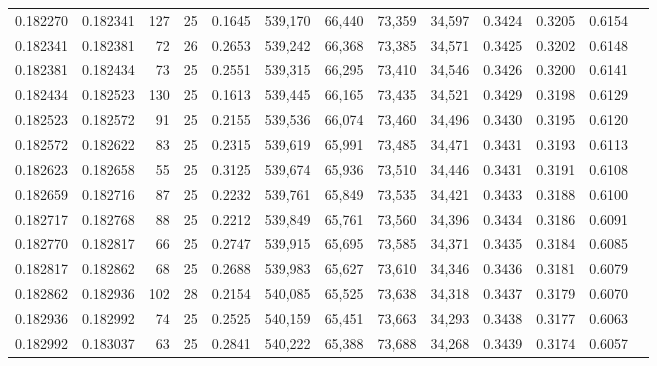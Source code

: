 \begin{tabular}{rrrrrrrrrrrrr}
0.182270 & 0.182341 &   127 &  25 &                                     0.1645 & 539,170 &  66,440 &  73,359 &  34,597 & 0.3424 & 0.3205 & 0.6154 \\
0.182341 & 0.182381 &    72 &  26 &                                     0.2653 & 539,242 &  66,368 &  73,385 &  34,571 & 0.3425 & 0.3202 & 0.6148 \\
0.182381 & 0.182434 &    73 &  25 &                                     0.2551 & 539,315 &  66,295 &  73,410 &  34,546 & 0.3426 & 0.3200 & 0.6141 \\
0.182434 & 0.182523 &   130 &  25 &                                     0.1613 & 539,445 &  66,165 &  73,435 &  34,521 & 0.3429 & 0.3198 & 0.6129 \\
0.182523 & 0.182572 &    91 &  25 &                                     0.2155 & 539,536 &  66,074 &  73,460 &  34,496 & 0.3430 & 0.3195 & 0.6120 \\
0.182572 & 0.182622 &    83 &  25 &                                     0.2315 & 539,619 &  65,991 &  73,485 &  34,471 & 0.3431 & 0.3193 & 0.6113 \\
0.182623 & 0.182658 &    55 &  25 &                                     0.3125 & 539,674 &  65,936 &  73,510 &  34,446 & 0.3431 & 0.3191 & 0.6108 \\
0.182659 & 0.182716 &    87 &  25 &                                     0.2232 & 539,761 &  65,849 &  73,535 &  34,421 & 0.3433 & 0.3188 & 0.6100 \\
0.182717 & 0.182768 &    88 &  25 &                                     0.2212 & 539,849 &  65,761 &  73,560 &  34,396 & 0.3434 & 0.3186 & 0.6091 \\
0.182770 & 0.182817 &    66 &  25 &                                     0.2747 & 539,915 &  65,695 &  73,585 &  34,371 & 0.3435 & 0.3184 & 0.6085 \\
0.182817 & 0.182862 &    68 &  25 &                                     0.2688 & 539,983 &  65,627 &  73,610 &  34,346 & 0.3436 & 0.3181 & 0.6079 \\
0.182862 & 0.182936 &   102 &  28 &                                     0.2154 & 540,085 &  65,525 &  73,638 &  34,318 & 0.3437 & 0.3179 & 0.6070 \\
0.182936 & 0.182992 &    74 &  25 &                                     0.2525 & 540,159 &  65,451 &  73,663 &  34,293 & 0.3438 & 0.3177 & 0.6063 \\
0.182992 & 0.183037 &    63 &  25 &                                     0.2841 & 540,222 &  65,388 &  73,688 &  34,268 & 0.3439 & 0.3174 & 0.6057 \\

\end{tabular}
